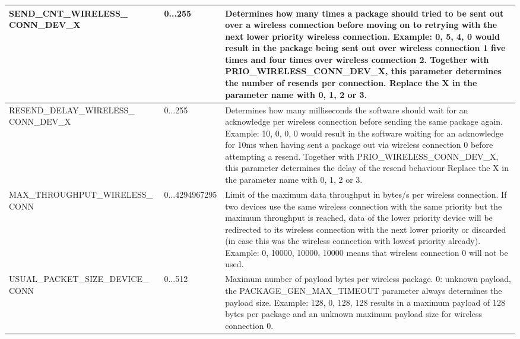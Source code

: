 \begin{center}
\begin{longtable}{p{6cm}p{1cm}p{7cm}}
            \hline
            SEND\_CNT\_WIRELESS\_ CONN\_DEV\_X &  0...255 & 
            Determines how many times a package should tried to be sent out over a wireless connection before moving on to retrying with the next lower priority wireless connection. Example: {0, 5, 4, 0} would result in the package being sent out over wireless connection 1 five times and four times over wireless connection 2. Together with PRIO\_WIRELESS\_CONN\_DEV\_X, this parameter determines the number of resends per connection. Replace the X in the parameter name with 0, 1, 2 or 3.\\
            \hline
            RESEND\_DELAY\_WIRELESS\_ CONN\_DEV\_X &  0...255 & 
            Determines how many milliseconds the software should wait for an acknowledge per wireless connection before sending the same package again. Example: {10, 0, 0, 0} would result in the software waiting for an acknowledge for 10ms when having sent a package out via wireless connection 0 before attempting a resend. Together with PRIO\_WIRELESS\_CONN\_DEV\_X, this parameter determines the delay of the resend behaviour Replace the X in the parameter name with 0, 1, 2 or 3.\\
            \hline
            MAX\_THROUGHPUT\_WIRELESS\_ CONN
             &  0...4294967295 & 
            Limit of the maximum data throughput in bytes/s per wireless connection. If two devices use the same wireless connection with the same priority but the maximum throughput is reached, data of the lower priority device will be redirected to its wireless connection with the next lower priority or discarded (in case this was the  wireless connection with lowest priority already). Example: {0, 10000, 10000, 10000} means that wireless connection 0 will not be used.\\
            \hline
            USUAL\_PACKET\_SIZE\_DEVICE\_ CONN  &  0...512 & 
            Maximum number of payload bytes per wireless package. 0: unknown payload, the PACKAGE\_GEN\_MAX\_TIMEOUT parameter always determines the payload size. Example: {128, 0, 128, 128} results in a maximum payload of 128 bytes per package and an unknown maximum payload size for wireless connection 0.\\
            \hline

\end{longtable}
\end{center}
